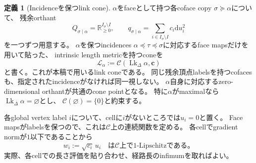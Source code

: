 \documentclass[11pt,a4paper]{ltjsarticle}
\newcommand{\RR}{\mathbb R}
\newcommand{\dd}{\mathrm d}
\newcommand{\Lk}{\operatorname{Lk}}
\newcommand{\cC}{\mathcal C}
\theoremstyle{plain}
\theoremstyle{definition}
\newtheorem{definition}[definition]{定義}
\theoremstyle{remark}
\begin{document}
\begin{definition}[Incidenceを保つlink cone]
\label{def:incidence-link}
$\alpha$をfaceとして持つ各coface copy $\sigma\succeq\alpha$について、
残余orthant
\[
 Q_{\sigma\mid\alpha}=\RR_{\ge0}^{I_\sigma\setminus I},
 \qquad
 q_{\sigma\mid\alpha}
 =\sum_{i\in I_\sigma\setminus I}c_i\dd u_i^2
\]
を一つずつ用意する。
$\alpha$を保つincidences
$\alpha\preceq\tau\preceq\sigma$に対応するface mapsだけを用いて貼った、
intrinsic length metricを持つconeを
\[
 \mathcal L_\alpha
 :=\cC(\Lk_\Delta\alpha,\bm c)
\]
と書く。これが本稿で用いるlink coneである。
同じ残余頂点labelsを持つcofacesも、指定されたincidenceがなければ同一視しない。
$\alpha$自身に対応するzero-dimensional orthantが共通のcone pointとなる。
特に$\alpha$がmaximalなら$\Lk_\Delta\alpha=\varnothing$とし、
$\cC(\varnothing)=\{0\}$と約束する。
\end{definition}

各global vertex label $i$について、cellに$i$がないところでは$u_i=0$と置く。
Face mapsがlabelsを保つので、これは$\cC$上の連続関数を定める。
各cellでgradient normが$1$以下であることから
\begin{equation}
\label{eq:cone-coordinate-barrier}
 w_i:=\sqrt{c_i}\,u_i
 \quad\text{は$\cC$上で$1$-Lipschitzである。}
\end{equation}
実際、各cellでの長さ評価を貼り合わせ、経路長のinfimumを取ればよい。
\end{document}

